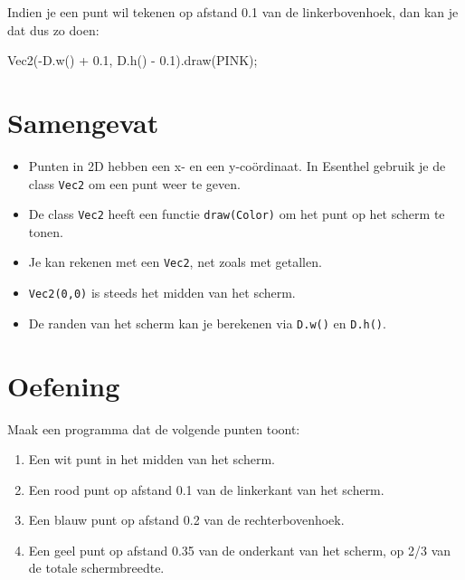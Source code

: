 Indien je een punt wil tekenen op afstand 0.1 van de linkerbovenhoek, dan kan je dat dus zo doen:

\begin{code}
Vec2(-D.w() + 0.1, D.h() - 0.1).draw(PINK);
\end{code}

\section{Samengevat}
\begin{itemize}
\item Punten in 2D hebben een x- en een y-co\"ordinaat. In Esenthel gebruik je de class \texttt{Vec2} om een punt weer te geven.
\item De class \texttt{Vec2} heeft een functie \texttt{draw(Color)} om het punt op het scherm te tonen.
\item Je kan rekenen met een \texttt{Vec2}, net zoals met getallen.
\item \texttt{Vec2(0,0)} is steeds het midden van het scherm.
\item De randen van het scherm kan je berekenen via \texttt{D.w()} en \texttt{D.h()}.
\end{itemize}

\section{Oefening}
Maak een programma dat de volgende punten toont:
\begin{enumerate}
	\item Een wit punt in het midden van het scherm.
	\item Een rood punt op afstand 0.1 van de linkerkant van het scherm.
	\item Een blauw punt op afstand 0.2 van de rechterbovenhoek.
	\item Een geel punt op afstand 0.35 van de onderkant van het scherm, op 2/3 van de totale schermbreedte.
\end{enumerate}
